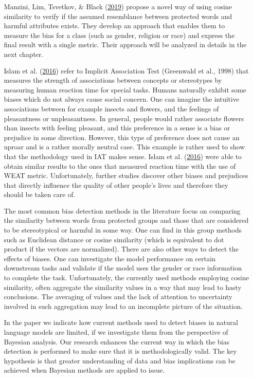 \documentclass[12pt,]{book}
\begin{document}
Manzini, Lim, Tsvetkov, \& Black
(\protect\hyperlink{ref-Manzini2019blackToCriminal}{2019}) propose a
novel way of using cosine similarity to verify if the assumed
resemblance between protected words and harmful attributes exists. They
develop an approach that enables them to measure the bias for a class
(such as gender, religion or race) and express the final result with a
single metric. Their approach will be analyzed in details in the next
chapter.

Islam et al. (\protect\hyperlink{ref-Caliskan2017Semantics}{2016}) refer
to Implicit Association Test (Greenwald et al., 1998) that measures the
strength of associations between concepts or stereotypes by measuring
human reaction time for special tasks. Humans naturally exhibit some
biases which do not always cause social concern. One can imagine the
intuitive associations between for example insects and flowers, and the
feelings of pleasantness or unpleasantness. In general, people would
rather associate flowers than insects with feeling pleasant, and this
preference in a sense is a bias or prejudice in some direction. However,
this type of preference does not cause an uproar and is a rather morally
neutral case. This example is rather used to show that the methodology
used in IAT makes sense. Islam et al.
(\protect\hyperlink{ref-Caliskan2017Semantics}{2016}) were able to
obtain similar results to the ones that measured reaction time with the
use of WEAT metric. Unfortunately, further studies discover other biases
and prejudices that directly influence the quality of other people's
lives and therefore they should be taken care of.

The most common bias detection methods in the literature focus on
comparing the similarity between words from protected groups and those
that are considered to be stereotypical or harmful in some way. One can
find in this group methods such as Euclidean distance or cosine
similarity (which is equivalent to dot product if the vectors are
normalized). There are also other ways to detect the effects of biases.
One can investigate the model performance on certain downstream tasks
and validate if the model uses the gender or race information to
complete the task. Unfortunately, the currently used methods employing
cosine similarity, often aggregate the similarity values in a way that
may lead to hasty conclusions. The averaging of values and the lack of
attention to uncertainty involved in such aggregation may lead to an
incomplete picture of the situation.

In the paper we indicate how current methods used to detect biases in
natural language models are limited, if we investigate them from the
perspective of Bayesian analysis. Our research enhances the current way
in which the bias detection is performed to make sure that it is
methodologically valid. The key hypothesis is that greater understanding
of data and bias implications can be achieved when Bayesian methods are
applied to issue.
\end{document}
